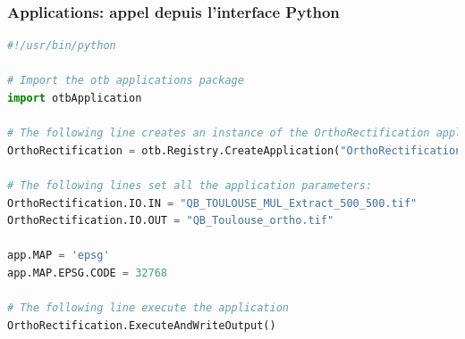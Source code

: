 \documentclass[8pt]{beamer}
\begin{document}
\begin{frame}[fragile]
\frametitle{Applications: appel depuis l'interface Python}
\begin{lstlisting}[language=python,breaklines=true,breakatwhitespace=true,frame = tb,framerule = 0.25pt,fontadjust,backgroundcolor={\color{listlightgray}},basicstyle = {\ttfamily\tiny},keywordstyle = {\ttfamily\color{listkeyword}\textbf},identifierstyle = {\ttfamily},commentstyle = {\ttfamily\color{listcomment}\textit},stringstyle = {\ttfamily},showstringspaces = false,showtabs = false,numbers = none,numbersep = 6pt, numberstyle={\ttfamily\color{listnumbers}},tabsize = 2]
#!/usr/bin/python 
 
# Import the otb applications package 
import otbApplication 
 
# The following line creates an instance of the OrthoRectification application 
OrthoRectification = otb.Registry.CreateApplication("OrthoRectification") 
 
# The following lines set all the application parameters: 
OrthoRectification.IO.IN = "QB_TOULOUSE_MUL_Extract_500_500.tif"
OrthoRectification.IO.OUT = "QB_Toulouse_ortho.tif"
 
app.MAP = 'epsg'
app.MAP.EPSG.CODE = 32768

# The following line execute the application 
OrthoRectification.ExecuteAndWriteOutput()
\end{lstlisting}
\end{frame}
\end{document}
